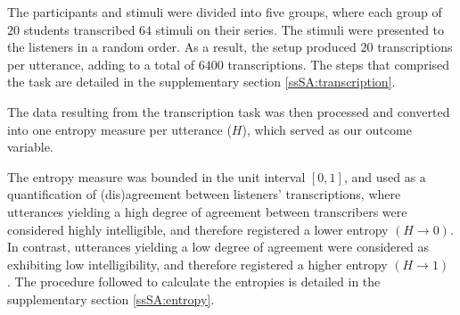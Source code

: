 The participants and stimuli were divided into five groups, where each group of $20$ students transcribed $64$ stimuli on their series. The stimuli were presented to the listeners in a random order. As a result, the setup produced $20$ transcriptions per utterance, adding to a total of $6400$ transcriptions. The steps that comprised the task are detailed in the supplementary section \ref{ssSA:transcription}. 
%
\begin{comment}
	present the stimuli based on the \textcolor{blue}{adaptive pairing algorithm} \citep{Pollitt_2012b}?
\end{comment}

The data resulting from the transcription task was then processed and converted into one entropy measure per utterance ($H$), which served as our outcome variable. 

The entropy measure was bounded in the unit interval $[0,1]$, and used as a quantification of (dis)agreement between listeners' transcriptions, where utterances yielding a high degree of agreement between transcribers were considered highly intelligible, and therefore registered a lower entropy $\left( H \rightarrow 0 \right)$. In contrast, utterances yielding a low degree of agreement were considered as exhibiting low intelligibility, and therefore registered a higher entropy $\left( H \rightarrow 1 \right)$ \citep{Boonen_et_al_2021, Faes_et_al_2021}. The procedure followed to calculate the entropies is detailed in the supplementary section \ref{ssSA:entropy}.
%
\begin{comment}
	\textbf{for the experimenter:} Based on \citet{Faes_et_al_2021} we depict the procedure for the experimenter:
	\begin{enumerate}
		\item 1. matching procedure 
		\item selection of suitable stimuli
		\item determine the number of stimuli per judge 
	\end{enumerate}	
\end{comment}
%
%
